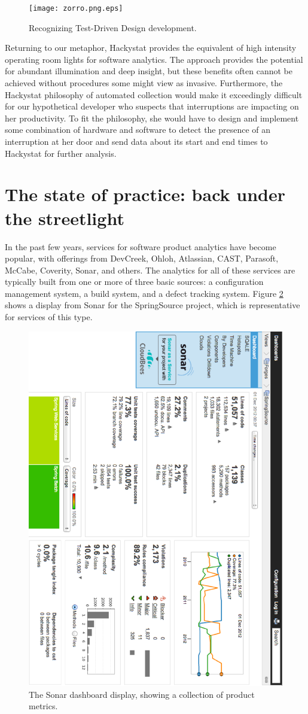 \documentclass[]{article}
\begin{document}
\begin{figure}[!tb]
\centering
\texttt{[image: zorro.png.eps]}
\caption{Recognizing Test-Driven Design development.}
\label{fig:zorro}
\end{figure}


Returning to our metaphor, Hackystat provides the equivalent of high intensity operating
room lights for software analytics. The approach provides the potential for abundant
illumination and deep insight, but these benefits often cannot be achieved without
procedures some might view as invasive.  Furthermore, the Hackystat philosophy of
automated collection would make it exceedingly difficult for our hypothetical
developer who suspects that interruptions are impacting on her productivity.  To fit 
the philosophy, she would have to design and implement some combination of hardware and
software to detect the presence of an interruption at her door and send data about its
start and end times to Hackystat for further analysis.

\section{The state of practice: back under the streetlight}

In the past few years, services for software product analytics have become popular, with
offerings from DevCreek, Ohloh, Atlassian, CAST, Parasoft, McCabe, Coverity, Sonar, and
others. The analytics for all of these services are typically built from one or more of
three basic sources: a configuration management system, a build system, and a defect
tracking system.  Figure \ref{fig:sonar} shows a display from Sonar for the SpringSource
project, which is representative for services of this type.

\begin{figure}[!tb]
\centering
\includegraphics[width=0.50\columnwidth, angle=90]{sonar-dashboard.eps}
\caption{The Sonar dashboard display, showing a collection of product metrics.}
\label{fig:sonar}
\end{figure}
\end{document}

